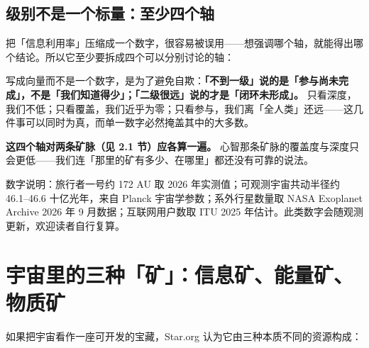 \documentclass[11pt,fontset=none]{ctexart}
\begin{document}
\subsection{级别不是一个标量：至少四个轴}

把「信息利用率」压缩成一个数字，很容易被误用——想强调哪个轴，就能得出哪个结论。所以它至少要拆成四个可以分别讨论的轴：


写成向量而不是一个数字，是为了避免自欺：\textbf{「不到一级」说的是「参与尚未完成」，不是「我们知道得少」；「二级很远」说的才是「闭环未形成」。} 只看深度，我们不低；只看覆盖，我们近乎为零；只看参与，我们离「全人类」还远——这几件事可以同时为真，而单一数字必然掩盖其中的大多数。

\textbf{这四个轴对两条矿脉（见 2.1 节）应各算一遍。} 心智那条矿脉的覆盖度与深度只会更低——我们连「那里的矿有多少、在哪里」都还没有可靠的说法。

{\small\color{inkfaint}
数字说明：旅行者一号约 172 AU 取 2026 年实测值；可观测宇宙共动半径约 46.1--46.6 十亿光年，来自 Planck 宇宙学参数；系外行星数量取 NASA Exoplanet Archive 2026 年 9 月数据；互联网用户数取 ITU 2025 年估计。此类数字会随观测更新，欢迎读者自行复算。\par}

\section{宇宙里的三种「矿」：信息矿、能量矿、物质矿}

如果把宇宙看作一座可开发的宝藏，Star.org 认为它由三种本质不同的资源构成：
\end{document}
